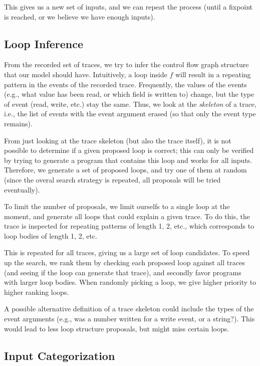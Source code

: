 \documentclass[]{article}
\begin{document}
This gives us a new set of inputs, and we can repeat the process (until a
fixpoint is reached, or we believe we have enough inputs).


\subsection{Loop Inference}

From the recorded set of traces, we try to infer the control flow graph
structure that our model should have.
Intuitively, a loop inside $f$ will result in a repeating pattern in the
events of the recorded trace.  Frequently, the values of the events (e.g.,
what value has been read, or which field is written to) change, but
the type of event (read, write, etc.) stay the same.  Thus, we
look at the \textit{skeleton} of a trace, i.e., the list of events with
the event argument erased (so that only the event type remains).

From just looking at the trace skeleton (but also the trace itself), it
is not possible to determine if a given proposed loop is correct;  this
can only be verified by trying to generate a program that contains this
loop and works for all inputs.
Therefore, we generate a set of proposed loops, and try one of them at
random (since the overal search strategy is repeated, all proposals
will be tried eventually).

To limit the number of proposals, we limit ourselfs to a single loop at
the moment, and generate all loops that could explain a given trace.  To
do this, the trace is inspected for repeating patterns of length 1, 2, etc.,
which corresponds to loop bodies of length 1, 2, etc.

This is repeated for all traces, giving us a large set of loop candidates.
To speed up the search, we rank them by checking each proposed loop against
all traces (and seeing if the loop can generate that trace), and secondly
favor programs with larger loop bodies.  When randomly picking a
loop, we give higher priority to higher ranking loops.

A possible alternative definition of a trace skeleton could include the
types of the event arguments (e.g., was a number written for a write event,
or a string?).  This would lead to less loop structure proposals, but might
miss certain loops.


\subsection{Input Categorization}
\end{document}

